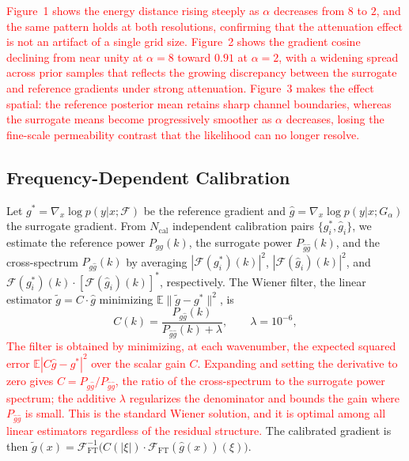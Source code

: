 \documentclass[12pt]{article}
\newcommand{\add}[1]{\textcolor{red}{#1}}
\begin{document}
\add{Figure~1 shows the energy distance rising steeply as $\alpha$ decreases from $8$ to $2$, and the same pattern holds at both resolutions, confirming that the attenuation effect is not an artifact of a single grid size. Figure~2 shows the gradient cosine declining from near unity at $\alpha=8$ toward $0.91$ at $\alpha=2$, with a widening spread across prior samples that reflects the growing discrepancy between the surrogate and reference gradients under strong attenuation. Figure~3 makes the effect spatial: the reference posterior mean retains sharp channel boundaries, whereas the surrogate means become progressively smoother as $\alpha$ decreases, losing the fine-scale permeability contrast that the likelihood can no longer resolve.}

\subsection{Frequency-Dependent Calibration}

Let $g^{*}=\nabla_{x}\log p(y|x;\mathcal{F})$ be the reference gradient and $\hat g=\nabla_{x}\log p(y|x;G_{\alpha})$ the surrogate gradient. From $N_{\mathrm{cal}}$ independent calibration pairs $\{g^{*}_{i},\hat g_{i}\}$, we estimate the reference power $P_{gg}(k)$, the surrogate power $P_{\hat g\hat g}(k)$, and the cross-spectrum $P_{g\hat g}(k)$ by averaging $|\mathcal{F}(g^{*}_{i})(k)|^{2}$, $|\mathcal{F}(\hat g_{i})(k)|^{2}$, and $\mathcal{F}(g^{*}_{i})(k)\cdot[\mathcal{F}(\hat g_{i})(k)]^{*}$, respectively. The Wiener filter, the linear estimator $\tilde g=C\cdot\hat g$ minimizing $\mathbb{E}\|\tilde g-g^{*}\|^{2}$, is
\begin{equation}
C(k)=\frac{P_{g\hat g}(k)}{P_{\hat g\hat g}(k)+\lambda},\qquad \lambda=10^{-6},
\end{equation}
\add{The filter is obtained by minimizing, at each wavenumber, the expected squared error $\mathbb{E}|C\hat g-g^{*}|^{2}$ over the scalar gain $C$. Expanding and setting the derivative to zero gives $C=P_{g\hat g}/P_{\hat g\hat g}$, the ratio of the cross-spectrum to the surrogate power spectrum; the additive $\lambda$ regularizes the denominator and bounds the gain where $P_{\hat g\hat g}$ is small. This is the standard Wiener solution, and it is optimal among all linear estimators regardless of the residual structure.} The calibrated gradient is then $\tilde g(x)=\mathcal{F}_{\mathrm{FT}}^{-1}\!\big(C(|\xi|)\cdot\mathcal{F}_{\mathrm{FT}}(\hat g(x))(\xi)\big)$.
\end{document}
